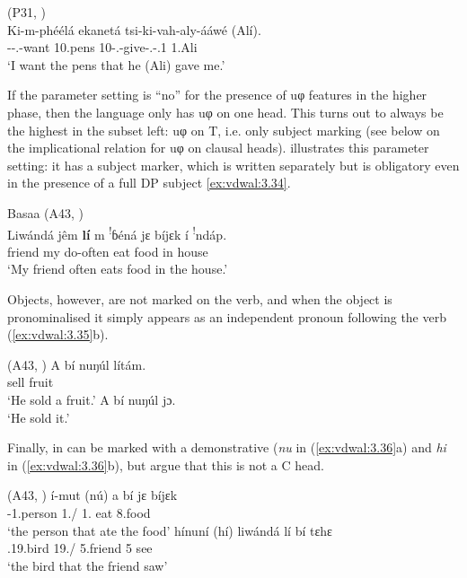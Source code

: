 \documentclass[output=paper]{langsci/langscibook}
\begin{document}
\ea {} (P31, \citealt[210]{vanderWal2010})\\
    \gll Ki-m-phéélá  ekanetá  tsi-ki-vah-aly-ááwé  (Alí).\\
        \Fsg-\Sm-\Prs.\Cj-want  10.pens  10-\Fsg.\Om{}-give-\Pfv.\Rel{}-\Poss{}.1  1.Ali\\
    \glt    ‘I want the pens that he (Ali) gave me.’
\z

If the parameter setting is \enquote{no} for the presence of uφ features in the higher
phase, then the language only has uφ on one head. This turns out to always be
the highest in the subset left: uφ on T, i.e. only subject marking (see
 below on the implicational relation for uφ on clausal heads).
 illustrates this parameter setting: it has a subject marker, which is
written separately but is obligatory even in the presence of a full DP subject
\eqref{ex:vdwal:3.34}.

\ea\label{ex:vdwal:3.34}Basaa (A43, \citealt[277]{Hyman2003}) \label{bkm:Ref347562219}\\
    \gll    Liwándá  jêm  \textbf{lí}  m  \textsuperscript{!}ɓéná  jɛ  bíjɛk  í  \textsuperscript{!}ndáp.\\
        friend  my  \Sm{}  \Prs{}  do-often  eat  food  in  house\\
    \glt    ‘My friend often eats food in the house.’
\z

Objects, however, are not marked on the verb, and when the object is
pronominalised it simply appears as an independent pronoun following the verb
(\ref{ex:vdwal:3.35}b).

\ea\label{ex:vdwal:3.35}  (A43, \citealt[278]{Hyman2003})\label{bkm:Ref347562250}
    \ea
    \gll A  bí  nuŋúl  lítám.\\
        \Sm{}  \Ppp{}  sell  fruit  \\
    \glt    ‘He sold a fruit.’
    \ex A  bí  nuŋúl  jɔ.\\
        ‘He sold it.’
    \z
\z

Finally,  in  can be marked with a demonstrative
(\emph{nu} in (\ref{ex:vdwal:3.36}a) and \emph{hi} in (\ref{ex:vdwal:3.36}b), but
\citet{JenksEtAl2017} argue that this is not a C head.

\ea\label{ex:vdwal:3.36}  (A43, \citealt[19, 20]{JenksEtAl2017}) \label{bkm:Ref347562274}
    \ea
    \gll    í-mut  (nú)  a  bí  \ds{}jɛ  bíjɛk\\
            \Aug{}{}-1.person  1.\Rel/\Dem{}  1.\Sm{}  \Ppp{}  eat  8.food\\
    \glt        ‘the person that ate the food’
    \ex\label{bkm:Ref347929302}
    \gll    hínuní  (hí)  liwándá  lí  bí  \ds{}tɛhɛ\\
            \Aug{}.19.bird  19.\Rel/\Dem{}  5.friend  5\Sm{}  \Ppp{}  see\\
    \glt        ‘the bird that the friend saw’
    \z
\z
\end{document}
